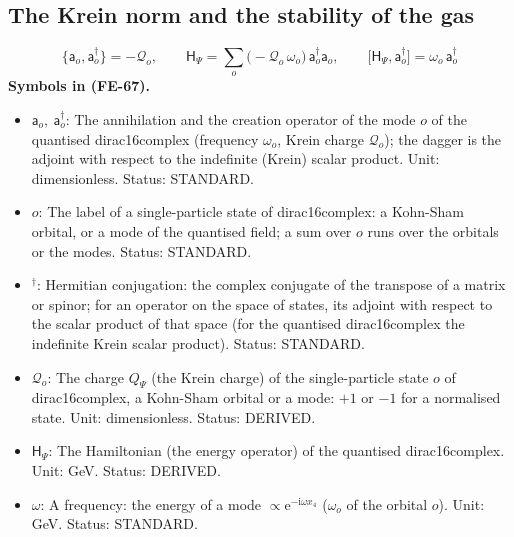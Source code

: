 \documentclass[
  10pt,
]{article}
\providecommand{\tightlist}{%
  \setlength{\itemsep}{0pt}\setlength{\parskip}{0pt}}
\begin{document}
\hypertarget{the-krein-norm-and-the-stability-of-the-gas}{%
\subsection{The Krein norm and the stability of the
gas}\label{the-krein-norm-and-the-stability-of-the-gas}}

\[
\big\{\mathsf{a}_o, \mathsf{a}_o^\dagger\big\} = -\mathcal{Q}_o,\qquad
\mathsf{H}_\Psi = \sum_o\big(-\mathcal{Q}_o\,\omega_o\big)\,\mathsf{a}_o^\dagger\mathsf{a}_o,\qquad
\big[\mathsf{H}_\Psi, \mathsf{a}_o^\dagger\big] = \omega_o\,\mathsf{a}_o^\dagger \tag{FE-67}
\] \textbf{Symbols in (FE-67).}

\begin{itemize}
\tightlist
\item
  \(\mathsf{a}_o,\ \mathsf{a}_o^\dagger\): The annihilation and the
  creation operator of the mode \(o\) of the quantised dirac16complex
  (frequency \(\omega_o\), Krein charge \(\mathcal{Q}_o\)); the dagger
  is the adjoint with respect to the indefinite (Krein) scalar product.
  Unit: dimensionless. Status: STANDARD.
\item
  \(o\): The label of a single-particle state of dirac16complex: a
  Kohn-Sham orbital, or a mode of the quantised field; a sum over \(o\)
  runs over the orbitals or the modes. Status: STANDARD.
\item
  \({}^\dagger\): Hermitian conjugation: the complex conjugate of the
  transpose of a matrix or spinor; for an operator on the space of
  states, its adjoint with respect to the scalar product of that space
  (for the quantised dirac16complex the indefinite Krein scalar
  product). Status: STANDARD.
\item
  \(\mathcal{Q}_o\): The charge \(Q_\Psi\) (the Krein charge) of the
  single-particle state \(o\) of dirac16complex, a Kohn-Sham orbital or
  a mode: \(+1\) or \(-1\) for a normalised state. Unit: dimensionless.
  Status: DERIVED.
\item
  \(\mathsf{H}_\Psi\): The Hamiltonian (the energy operator) of the
  quantised dirac16complex. Unit: GeV. Status: DERIVED.
\item
  \(\omega\): A frequency: the energy of a mode
  \(\propto \mathrm{e}^{-\mathrm{i}\omega x_4}\) (\(\omega_o\) of the
  orbital \(o\)). Unit: GeV. Status: STANDARD.
\end{itemize}
\end{document}
